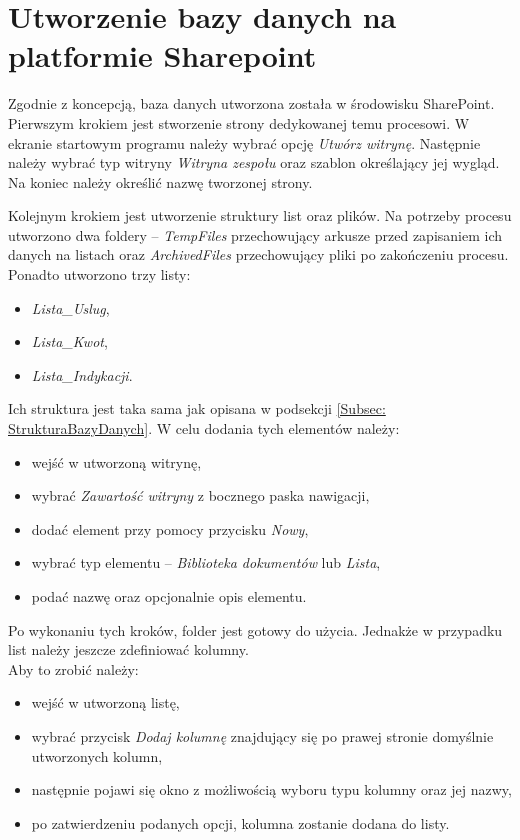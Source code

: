 \section{Utworzenie bazy danych na platformie Sharepoint}

Zgodnie z koncepcją, baza danych utworzona została w środowisku SharePoint.
Pierwszym krokiem jest stworzenie strony dedykowanej temu procesowi. W ekranie startowym programu należy wybrać opcję \emph{Utwórz witrynę}. Następnie należy wybrać typ witryny \emph{Witryna zespołu} oraz szablon określający jej wygląd. Na koniec należy określić nazwę tworzonej strony.

Kolejnym krokiem jest utworzenie struktury list oraz plików. Na potrzeby procesu utworzono dwa foldery -- \emph{TempFiles} przechowujący arkusze przed zapisaniem ich danych na listach oraz \emph{ArchivedFiles} przechowujący pliki po zakończeniu procesu.
Ponadto utworzono trzy listy:
\begin{itemize}
    \item \emph{Lista\_Uslug},
    \item \emph{Lista\_Kwot},
    \item \emph{Lista\_Indykacji}.
\end{itemize}
\hfill \break
Ich struktura jest taka sama jak opisana w podsekcji \ref{Subsec: StrukturaBazyDanych}.
W celu dodania tych elementów należy:
\begin{itemize}
    \item wejść w utworzoną witrynę,
    \item wybrać \emph{Zawartość witryny} z bocznego paska nawigacji,
    \item dodać element przy pomocy przycisku \emph{Nowy},
    \item wybrać typ elementu -- \emph{Biblioteka dokumentów} lub \emph{Lista},
    \item podać nazwę oraz opcjonalnie opis elementu.
\end{itemize}

Po wykonaniu tych kroków, folder jest gotowy do użycia. Jednakże w przypadku list należy jeszcze zdefiniować kolumny. \\Aby to zrobić należy:
\begin{itemize}
    \item wejść w utworzoną listę,
    \item wybrać przycisk \emph{Dodaj kolumnę} znajdujący się po prawej stronie domyślnie utworzonych kolumn,
    \item następnie pojawi się okno z możliwością wyboru typu kolumny oraz jej nazwy,
    \item po zatwierdzeniu podanych opcji, kolumna zostanie dodana do listy.
\end{itemize}

